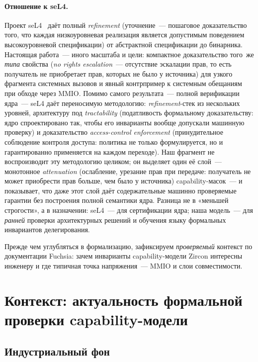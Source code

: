 \documentclass[11pt,a4paper]{article}
\begin{document}
\paragraph{Отношение к seL4.}
Проект seL4~\cite{sel4,sel4overview} даёт полный \emph{refinement}
(уточнение~--- пошаговое доказательство того, что каждая
низкоуровневая реализация является допустимым поведением
высокоуровневой спецификации) от абстрактной спецификации до
бинарника. Настоящая работа~--- иного масштаба и цели: компактное
доказательство того~же \emph{типа} свойства (\emph{no rights
	escalation}~--- отсутствие эскалации прав, то есть получатель не
приобретает прав, которых не было у источника) для узкого фрагмента
системных вызовов и явный контрпример к системным обещаниям при обходе
через MMIO. Помимо самого результата~--- полной верификации ядра~---
seL4 даёт переносимую методологию: \emph{refinement}-стек из
нескольких уровней, архитектуру под \emph{tractability} (податливость
формальному доказательству: ядро спроектировано так, чтобы его
инварианты вообще допускали машинную проверку) и доказательство
\emph{access-control enforcement} (принудительное соблюдение контроля
доступа: политика не только формулируется, но и гарантированно
применяется на каждом переходе). Наш фрагмент не воспроизводит эту
методологию целиком; он выделяет один её слой~--- монотонное
\emph{attenuation} (ослабление, урезание прав при передаче:
получатель не может приобрести прав больше, чем было у источника)
\textenglish{capability}-масок~--- и показывает, что даже этот слой
даёт содержательные машинно проверяемые гарантии без построения
полной семантики ядра. Разница не в «меньшей строгости», а в
назначении: seL4~--- для сертификации ядра; наша модель~--- для
\emph{ранней} проверки архитектурных решений и обучения языку
формальных инвариантов делегирования.

Прежде чем углубляться в формализацию, зафиксируем
\emph{проверяемый} контекст по документации Fuchsia: зачем инварианты
\textenglish{capability}-модели Zircon интересны инженеру и где типичная
точка напряжения~--- MMIO и слои совместимости.

\section{Контекст: актуальность формальной проверки \textenglish{capability}-модели}

\subsection{Индустриальный фон}
\end{document}
